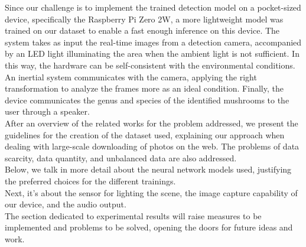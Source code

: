 \documentclass[conference]{IEEEtran}
\begin{document}
Since our challenge is to implement the trained detection model on a pocket-sized device, specifically the Raspberry Pi Zero 2W\cite{raspberrypi2021zero2wbrief}, a more lightweight model was trained on our dataset to enable a fast enough inference on this device. The system takes as input the real-time images from a detection camera, accompanied by an LED light illuminating the area when the ambient light is not sufficient. In this way, the hardware can be self-consistent with the environmental conditions. An inertial system communicates with the camera, applying the right transformation to analyze the frames more as an ideal condition. Finally, the device communicates the genus and species of the identified mushrooms to the user through a speaker.\\
After an overview of the related works for the problem addressed, we present the guidelines for the creation of the dataset used, explaining our approach when dealing with large-scale downloading of photos on the web. The problems of data scarcity, data quantity, and unbalanced data are also addressed.\\
Below, we talk in more detail about the neural network models used, justifying the preferred choices for the different trainings.\\
Next, it's about the sensor for lighting the scene, the image capture capability of our device, and the audio output.\\
The section dedicated to experimental results will raise measures to be implemented and problems to be solved, opening the doors for future ideas and work.
\end{document}

